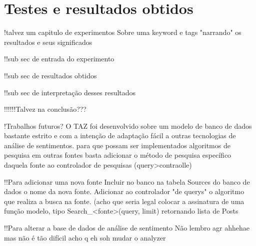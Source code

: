 \chapter{Testes e resultados obtidos}
\label{cha: TestesEResultados}
!talvez um capitulo de experimentos
Sobre uma keyword e tags "narrando" os resultados e seus significados

!!sub sec de entrada do experimento

!!sub sec de resultados obtidos 

!!sub sec de interpretação desses resultados



!!!!!!Talvez na conclusão???

!Trabalhos futuros?
O TAZ foi desenvolvido sobre um modelo de banco de dados bastante estrito e com a intenção de adaptação fácil a outras tecnologias de análise de sentimentos.
para que possam ser implementados algoritmos de pesquisa em outras fontes basta adicionar o método de pesquisa específico daquela fonte ao controlador de pesquisas (query>contraolle)

!!Para adicionar uma nova fonte
Incluir no banco na tabela Sources do banco de dados o nome da nova fonte.
Adicionar ao controlador "de querys" o algoritmo que realiza a busca na fonte.
(acho que seria legal colocar a assinatura de uma função modelo, tipo Search_<fonte>(query, limit) retornando lista de Posts

!!Para alterar a base de dados de análise de sentimento
Não lembro agr ahhehae mas não é tão difícil acho q eh soh mudar o analyzer